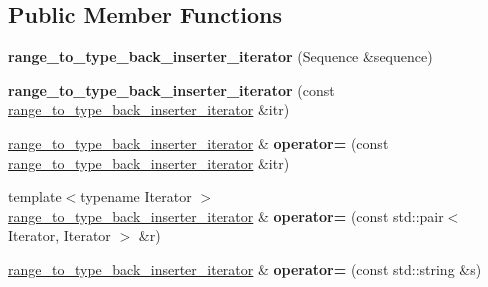 \subsection*{Public Member Functions}
\begin{DoxyCompactItemize}
\item 
\hypertarget{classstrtk_1_1range__to__type__back__inserter__iterator_a667570a6686a54d36021adb22bd7e189}{{\bfseries range\-\_\-to\-\_\-type\-\_\-back\-\_\-inserter\-\_\-iterator} (Sequence \&sequence)}\label{classstrtk_1_1range__to__type__back__inserter__iterator_a667570a6686a54d36021adb22bd7e189}

\item 
\hypertarget{classstrtk_1_1range__to__type__back__inserter__iterator_ae83f6b4cb63e9b1c82bd429242e1e6d8}{{\bfseries range\-\_\-to\-\_\-type\-\_\-back\-\_\-inserter\-\_\-iterator} (const \hyperlink{classstrtk_1_1range__to__type__back__inserter__iterator}{range\-\_\-to\-\_\-type\-\_\-back\-\_\-inserter\-\_\-iterator} \&itr)}\label{classstrtk_1_1range__to__type__back__inserter__iterator_ae83f6b4cb63e9b1c82bd429242e1e6d8}

\item 
\hypertarget{classstrtk_1_1range__to__type__back__inserter__iterator_a7f3e029249f012a5d2b11c00c51b4d63}{\hyperlink{classstrtk_1_1range__to__type__back__inserter__iterator}{range\-\_\-to\-\_\-type\-\_\-back\-\_\-inserter\-\_\-iterator} \& {\bfseries operator=} (const \hyperlink{classstrtk_1_1range__to__type__back__inserter__iterator}{range\-\_\-to\-\_\-type\-\_\-back\-\_\-inserter\-\_\-iterator} \&itr)}\label{classstrtk_1_1range__to__type__back__inserter__iterator_a7f3e029249f012a5d2b11c00c51b4d63}

\item 
\hypertarget{classstrtk_1_1range__to__type__back__inserter__iterator_a7cdbe99e5555cdafb5f3077490fa2659}{{\footnotesize template$<$typename Iterator $>$ }\\\hyperlink{classstrtk_1_1range__to__type__back__inserter__iterator}{range\-\_\-to\-\_\-type\-\_\-back\-\_\-inserter\-\_\-iterator} \& {\bfseries operator=} (const std\-::pair$<$ Iterator, Iterator $>$ \&r)}\label{classstrtk_1_1range__to__type__back__inserter__iterator_a7cdbe99e5555cdafb5f3077490fa2659}

\item 
\hypertarget{classstrtk_1_1range__to__type__back__inserter__iterator_a55173efd60502915cdbcc53dfb2f3f88}{\hyperlink{classstrtk_1_1range__to__type__back__inserter__iterator}{range\-\_\-to\-\_\-type\-\_\-back\-\_\-inserter\-\_\-iterator} \& {\bfseries operator=} (const std\-::string \&s)}\label{classstrtk_1_1range__to__type__back__inserter__iterator_a55173efd60502915cdbcc53dfb2f3f88}


\end{DoxyCompactItemize}
